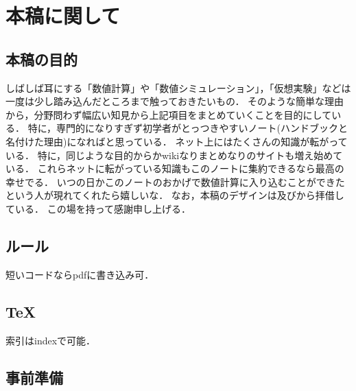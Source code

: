 \chapter{本稿に関して}

\section{本稿の目的}
しばしば耳にする「数値計算」や「数値シミュレーション」，「仮想実験」などは一度は少し踏み込んだところまで触っておきたいもの．
そのような簡単な理由から，分野問わず幅広い知見から上記項目をまとめていくことを目的にしている．
特に，専門的になりすぎず初学者がとっつきやすいノート(ハンドブックと名付けた理由)になればと思っている．
ネット上にはたくさんの知識が転がっている．
特に，同じような目的からかwikiなりまとめなりのサイトも増え始めている．
これらネットに転がっている知識もこのノートに集約できるなら最高の幸せでる．
いつの日かこのノートのおかげで数値計算に入り込むことができたという人が現れてくれたら嬉しいな．
なお，本稿のデザインは及びから拝借している．
この場を持って感謝申し上げる．

\section{ルール}
短いコードならpdfに書き込み可．



\section{\TeX}

索引はindexで可能．


\section{事前準備}

